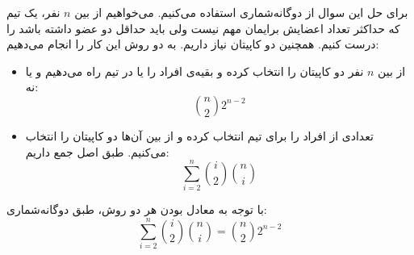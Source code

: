 \p
برای حل این سوال از دوگانه‌شماری استفاده می‌کنیم. می‌خواهیم از بین
$n$
نفر، یک تیم که حداکثر تعداد اعضایش برایمان مهم نیست ولی باید حداقل دو عضو داشته باشد را درست کنیم. همچنین دو کاپیتان نیاز داریم. به دو روش این کار را انجام می‌دهیم:
\begin{itemize}
\item
از بین 
$n$
نفر دو کاپیتان را انتخاب کرده و بقیه‌ی افراد را یا در تیم راه می‌دهیم و یا نه:
$$\binom{n}{2}2^{n-2}$$
\item
تعدادی از افراد را برای تیم انتخاب کرده و از بین آن‌ها دو کاپیتان را انتخاب می‌کنیم. طبق اصل جمع داریم:
$$\sum_{i=2}^{n}\binom{i}{2}\binom{n}{i}$$
\end{itemize}
با توجه به معادل بودن هر دو روش، طبق دوگانه‌شماری:
$$\sum_{i=2}^{n}\binom{i}{2}\binom{n}{i} = \binom{n}{2}2^{n-2}$$
